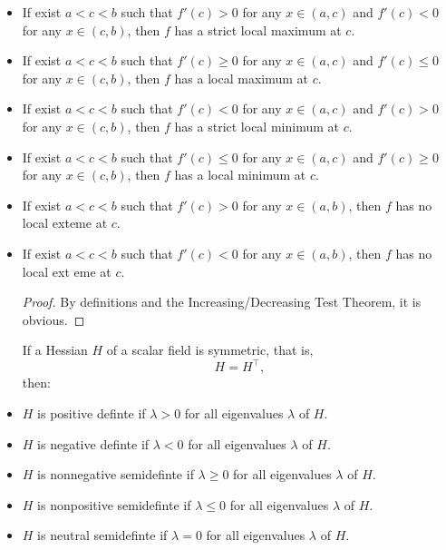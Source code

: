 \documentclass[a4paper,12pt]{report}
\begin{document}
\begin{itemize}
\begin{itemize}
\begin{proof}
    Take any two points $c,d\in (a,b)$ with $c<d$. By MVT, there exists $g\in (c,d)$ such that
    \[f'(g)=\frac{f(d)-f(c)}{d-c}.\]
    Because $f'(g)>0$ and $d-c>0$, we get $f(d)-f(c)>0$.
    
    The second and third statements are obviously true as the first holds.

    The other statements can be proven similarly.
\end{proof}
Let $f\colon I\subseteq\mathbb{R}\to\mathbb{R}$ be a function, $c$ be a critical point of $f$, and $f'$ be continuous at $c$.
\bit
\item If exist $a<c<b$ such that $f'(c)>0$ for any $x\in (a,c)$ and $f'(c)<0$ for any $x\in (c,b)$, then $f$ has a strict local maximum at $c$.
\item If exist $a<c<b$ such that $f'(c)\geq 0$ for any $x\in (a,c)$ and $f'(c)\leq 0$ for any $x\in (c,b)$, then $f$ has a local maximum at $c$.
\item If exist $a<c<b$ such that $f'(c)<0$ for any $x\in (a,c)$ and $f'(c)>0$ for any $x\in (c,b)$, then $f$ has a strict local minimum at $c$.
\item If exist $a<c<b$ such that $f'(c)\leq 0$ for any $x\in (a,c)$ and $f'(c)\geq 0$ for any $x\in (c,b)$, then $f$ has a local minimum at $c$.
\item If exist $a<c<b$ such that $f'(c)>0$ for any $x\in (a,b)$, then $f$ has no local exteme at $c$.
\item If exist $a<c<b$ such that $f'(c)<0$ for any $x\in (a,b)$, then $f$ has no local ext
eme at $c$.
\eit
\begin{proof}
    By definitions and the Increasing/Decreasing Test Theorem, it is obvious.
\end{proof}
If a Hessian $H$ of a scalar field is symmetric, that is,
\[H=H^\top,\]
then:
\bit
\item $H$ is positive definte if $\lambda>0$ for all eigenvalues $\lambda$ of $H$.
\item $H$ is negative definte if $\lambda<0$ for all eigenvalues $\lambda$ of $H$.
\item $H$ is nonnegative semidefinte if $\lambda\geq 0$ for all eigenvalues $\lambda$ of $H$.
\item $H$ is nonpositive semidefinte if $\lambda\leq 0$ for all eigenvalues $\lambda$ of $H$.
\item $H$ is neutral semidefinte if $\lambda=0$ for all eigenvalues $\lambda$ of $H$.

\end{itemize}
\end{itemize}
\end{document}
